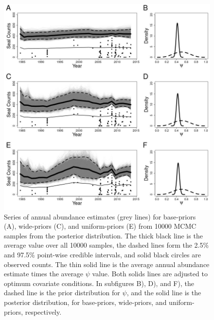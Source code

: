 \documentclass[12pt, titlepage]{article}\usepackage[]{graphicx}\usepackage[]{color}
\begin{document}
\begin{figure}[H]
\begin{center}
\includegraphics[width=0.8\linewidth]{figure/plot-trendlines-1.jpeg}
\end{center}
\caption{Series of annual abundance estimates (grey lines) for base-priors (A), wide-priors (C), and uniform-priors (E) from 10000 MCMC samples from the posterior distribution.  The thick black line is the average value over all 10000 samples, the dashed lines form the 2.5\% and 97.5\% point-wise credible intervals, and solid black circles are observed counts. The thin solid line is the average annual abundance estimate times the average $\psi$ value.  Both solids lines are adjusted to optimum covariate conditions. In subfigures B), D), and F), the dashed line is the prior distribution for $\psi$, and the solid line is the posterior distribution, for base-priors, wide-priors, and uniform-priors, respectively.   \label{plot-trendlines}}         
\end{figure}


\end{document}
